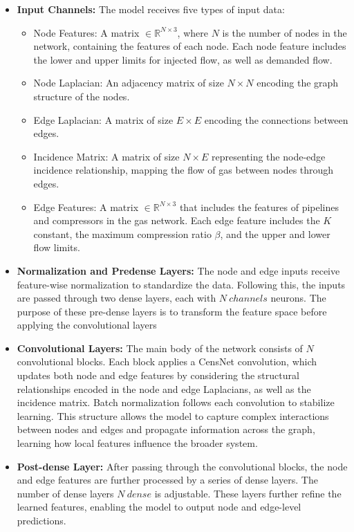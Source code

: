 \begin{itemize}
    \item \textbf{Input Channels:} The model receives five types of input data:
        
        
    \begin{itemize}
        \item Node Features: A matrix $\in \mathbb{R}^{N \times 3}$, where $N$ is the number of nodes in the network, containing the features of each node. Each node feature includes the lower and upper limits for injected flow, as well as demanded flow.
        \item Node Laplacian: An adjacency matrix of size $N\times N$ encoding the graph structure of the nodes.
        \item Edge Laplacian: A matrix of size $E\times E$ encoding the connections between edges.
        \item Incidence Matrix: A matrix of size $N\times E$ representing the node-edge incidence relationship, mapping the flow of gas between nodes through edges.
        \item Edge Features: A matrix $\in \mathbb{R}^{N \times 3}$ that includes the features of pipelines and compressors in the gas network. Each edge feature includes the $K$ constant, the maximum compression ratio $\beta$, and the upper and lower flow limits.
    \end{itemize}

    \item \textbf{Normalization and Pre\-dense Layers:} The node and edge inputs receive feature-wise normalization to standardize the data. Following this, the inputs are passed through two dense layers, each with $N \ channels$ neurons. The purpose of these pre-dense layers is to transform the feature space before applying the convolutional layers 

    \item \textbf{Convolutional Layers:} The main body of the network consists of \(N\) convolutional blocks. Each block applies a CensNet convolution, which updates both node and edge features by considering the structural relationships encoded in the node and edge Laplacians, as well as the incidence matrix. Batch normalization follows each convolution to stabilize learning. This structure allows the model to capture complex interactions between nodes and edges and propagate information across the graph, learning how local features influence the broader system.
   
    \item \textbf{Post-dense Layer:} After passing through the convolutional blocks, the node and edge features are further processed by a series of dense layers. The number of dense layers $N \ dense$ is adjustable. These layers further refine the learned features, enabling the model to output node and edge-level predictions. 
   

\end{itemize}
